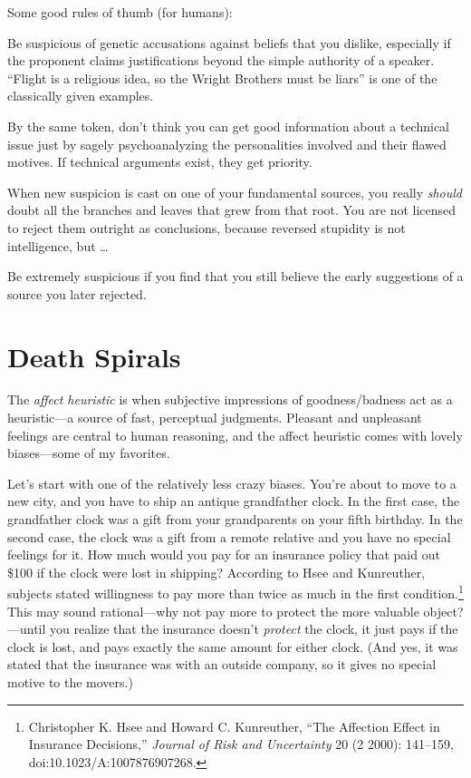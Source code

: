 {
 Some good rules of thumb (for humans):}

{
 Be suspicious of genetic accusations against beliefs that you
dislike, especially if the proponent claims justifications beyond the
simple authority of a speaker. ``Flight is a religious
idea, so the Wright Brothers must be liars'' is one
of the classically given examples.}

{
 By the same token, don't think you can get good
information about a technical issue just by sagely psychoanalyzing the
personalities involved and their flawed motives. If technical arguments
exist, they get priority.}

{
 When new suspicion is cast on one of your fundamental sources, you
really \textit{should} doubt all the branches and leaves that grew from
that root. You are not licensed to reject them outright as conclusions,
because reversed stupidity is not intelligence, but \ldots}

{
 Be extremely suspicious if you find that you still believe the
early suggestions of a source you later rejected.}

\myendsectiontext

\chapter{Death Spirals}


{
 The \textit{affect heuristic} is when subjective impressions of
goodness/badness act as a heuristic---a source of fast, perceptual
judgments. Pleasant and unpleasant feelings are central to human
reasoning, and the affect heuristic comes with lovely biases---some of
my favorites. }

{
 Let's start with one of the relatively less crazy
biases. You're about to move to a new city, and you
have to ship an antique grandfather clock. In the first case, the
grandfather clock was a gift from your grandparents on your fifth
birthday. In the second case, the clock was a gift from a remote
relative and you have no special feelings for it. How much would you
pay for an insurance policy that paid out \$100 if the clock were lost
in shipping? According to Hsee and Kunreuther, subjects stated
willingness to pay more than twice as much in the first
condition.\footnote{Christopher K. Hsee and Howard C. Kunreuther,
``The Affection Effect in Insurance
Decisions,'' \textit{Journal of Risk and Uncertainty}
20 (2 2000): 141--159, doi:10.1023/A:1007876907268.} This may sound rational---why not pay
more to protect the more valuable object?---until you realize that the
insurance doesn't \textit{protect} the clock, it just
pays if the clock is lost, and pays exactly the same amount for either
clock. (And yes, it was stated that the insurance was with an outside
company, so it gives no special motive to the movers.)}


